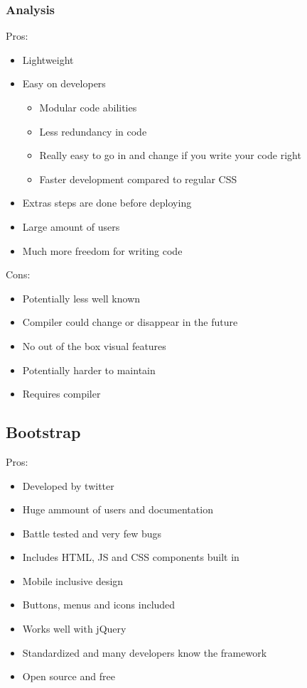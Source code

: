 \documentclass[draftclsnofoot,onecolumn,letterpaper,10pt,compsoc]{IEEEtran}
\begin{document}
  	\subsubsection{Analysis}

    Pros:
    \begin{itemize}
      \item Lightweight
      \item Easy on developers
      \begin{itemize}
        \item Modular code abilities
        \item Less redundancy in code
        \item Really easy to go in and change if you write your code right
        \item Faster development compared to regular CSS
      \end{itemize}
      \item Extras steps are done before deploying
      \item Large amount of users
      \item Much more freedom for writing code
    \end{itemize}

    Cons:
    \begin{itemize}
      \item Potentially less well known
      \item Compiler could change or disappear in the future
      \item No out of the box visual features
      \item Potentially harder to maintain
      \item Requires compiler
    \end{itemize}

	\subsection{Bootstrap}

  Pros:
  \begin{itemize}
    \item Developed by twitter
    \item Huge ammount of users and documentation
    \item Battle tested and very few bugs
    \item Includes HTML, JS and CSS components built in
    \item Mobile inclusive design
    \item Buttons, menus and icons included
    \item Works well with jQuery
    \item Standardized and many developers know the framework
    \item Open source and free
  \end{itemize}
\end{document}
